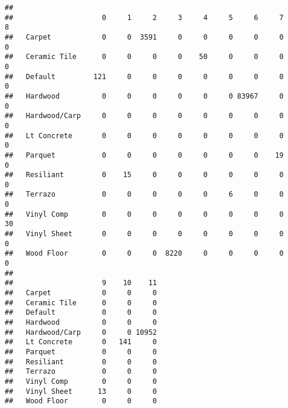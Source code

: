 \documentclass[]{article}
\newenvironment{Shaded}{\begin{snugshade}}{\end{snugshade}}
\newcommand{\CommentTok}[1]{\textcolor[rgb]{0.56,0.35,0.01}{\textit{#1}}}
\newcommand{\DataTypeTok}[1]{\textcolor[rgb]{0.13,0.29,0.53}{#1}}
\newcommand{\DecValTok}[1]{\textcolor[rgb]{0.00,0.00,0.81}{#1}}
\newcommand{\KeywordTok}[1]{\textcolor[rgb]{0.13,0.29,0.53}{\textbf{#1}}}
\newcommand{\NormalTok}[1]{#1}
\newcommand{\OperatorTok}[1]{\textcolor[rgb]{0.81,0.36,0.00}{\textbf{#1}}}
\newcommand{\StringTok}[1]{\textcolor[rgb]{0.31,0.60,0.02}{#1}}
\begin{document}
\begin{verbatim}
##                
##                     0     1     2     3     4     5     6     7     8
##   Carpet            0     0  3591     0     0     0     0     0     0
##   Ceramic Tile      0     0     0     0    50     0     0     0     0
##   Default         121     0     0     0     0     0     0     0     0
##   Hardwood          0     0     0     0     0     0 83967     0     0
##   Hardwood/Carp     0     0     0     0     0     0     0     0     0
##   Lt Concrete       0     0     0     0     0     0     0     0     0
##   Parquet           0     0     0     0     0     0     0    19     0
##   Resiliant         0    15     0     0     0     0     0     0     0
##   Terrazo           0     0     0     0     0     6     0     0     0
##   Vinyl Comp        0     0     0     0     0     0     0     0    30
##   Vinyl Sheet       0     0     0     0     0     0     0     0     0
##   Wood Floor        0     0     0  8220     0     0     0     0     0
##                
##                     9    10    11
##   Carpet            0     0     0
##   Ceramic Tile      0     0     0
##   Default           0     0     0
##   Hardwood          0     0     0
##   Hardwood/Carp     0     0 10952
##   Lt Concrete       0   141     0
##   Parquet           0     0     0
##   Resiliant         0     0     0
##   Terrazo           0     0     0
##   Vinyl Comp        0     0     0
##   Vinyl Sheet      13     0     0
##   Wood Floor        0     0     0
\end{verbatim}

\begin{Shaded}
\end{Shaded}
\end{document}
